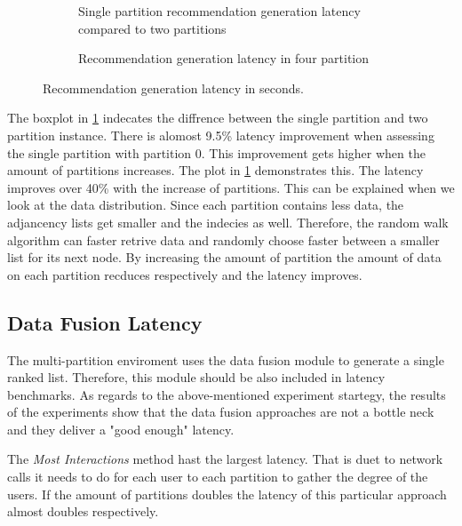 \begin{figure}[ht!]
    \centering
    \begin{subfigure}{\textwidth}
        \centering
        
        \caption{Single partition recommendation generation latency compared to two partitions}\label{plot:recommendation-latency-two-partitions}
    \end{subfigure}\qquad

    \begin{subfigure}{\textwidth}
        \centering
        
        \caption{Recommendation generation latency in four partition}\label{plot:recommendation-latency-four-partitions}
    \end{subfigure}\qquad
    
    \caption{Recommendation generation latency in seconds.}
\end{figure}

The boxplot in \ref{plot:recommendation-latency-two-partitions} indecates the diffrence between the single partition and two partition instance. There is alomost 9.5\% latency improvement when assessing the single partition with partition 0. This improvement gets higher when the amount of partitions increases. The plot in \ref{plot:recommendation-latency-two-partitions} demonstrates this. The latency improves over 40\% with the increase of partitions. This can be explained when we look at the data distribution. Since each partition contains less data, the adjancency lists get smaller and the indecies as well. Therefore, the random walk algorithm can faster retrive data and randomly choose faster between a smaller list for its next node. By increasing the amount of partition the amount of data on each partition recduces respectively and the latency improves.

\subsection{Data Fusion Latency}
\label{subsec:data-fusion-latency}
The multi-partition enviroment uses the data fusion module to generate a single ranked list. Therefore, this module should be also included in latency benchmarks. As regards to the above-mentioned experiment startegy, the results of the experiments show that the data fusion approaches are not a bottle neck and they deliver a "good enough" latency.


The \emph{Most Interactions} method hast the largest latency. That is duet to network calls it needs to do for each user to each partition to gather the degree of the users. If the amount of partitions doubles the latency of this particular approach almost doubles respectively.


